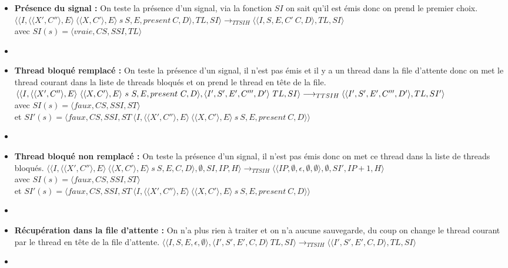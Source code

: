 \documentclass[10pt,a4paper]{report}
\begin{document}
\begin{enumerate}
\begin{itemize}
			\item[] \textbf{Présence du signal :} On teste la présence d'un signal, via la fonction $SI$ on sait qu'il est émis donc on prend le premier choix.
			\smallbreak
			$\langle\langle I,\langle\langle X',C''\rangle,E\rangle~\langle\langle X,C'\rangle,E\rangle~s~S,E,present~C,D\rangle,TL,SI\rangle 
			\longrightarrow_{TTSIH} 
			\langle\langle I,S,E,C'~C,D\rangle,TL,SI\rangle$ 
			\\avec $SI(s) = \langle vraie,CS,SSI,TL\rangle$
			\item[] \newpage
			
			
			
			
			\item[] \textbf{ Thread bloqué remplacé :} On teste la présence d'un signal, il n'est pas émis et il y a un thread dans la file d'attente donc on met le thread courant dans la liste de threads bloqués et on prend le thread en tête de la file.
			\smallbreak
			$\langle\langle I,\langle\langle X',C''\rangle,E\rangle~\langle\langle X,C'\rangle,E\rangle~s~S,E,present~C,D\rangle,\langle I',S',E',C''',D'\rangle~TL,SI\rangle 
			\\\longrightarrow_{TTSIH} 
			\langle\langle I',S',E',C''',D'\rangle,TL,SI'\rangle$ 
			\\avec $SI(s) = \langle faux,CS,SSI,ST\rangle$
			\\et $SI'(s) = \langle faux,CS,SSI,ST~\langle I,\langle\langle X',C''\rangle,E\rangle~\langle\langle X,C'\rangle,E\rangle~s~S,E,present~C,D\rangle\rangle$
			\item[]	
			
			\item[] \textbf{Thread bloqué non remplacé :} On teste la présence d'un signal, il n'est pas émis donc on met ce thread dans la liste de threads bloqués.
			\smallbreak 
			$\langle\langle I,\langle\langle X',C''\rangle,E\rangle~\langle\langle X,C'\rangle,E\rangle~s~S,E,C,D\rangle,\emptyset,SI,IP,H\rangle 
			\longrightarrow_{TTSIH} 
			\langle\langle IP,\emptyset,\epsilon,\emptyset,\emptyset\rangle,\emptyset,SI',IP+1,H\rangle$
			\\avec $SI(s) = \langle faux,CS,SSI,ST\rangle$
			\\et $SI'(s) = \langle faux,CS,SSI,ST~\langle I,\langle\langle X',C''\rangle,E\rangle~\langle\langle X,C'\rangle,E\rangle~s~S,E,present~C,D\rangle\rangle$
			\item[]
			
			\item[] \textbf{Récupération dans la file d'attente :} On n'a plus rien à traiter et on n'a aucune sauvegarde, du coup on change le thread courant par le thread en tête de la file d'attente.
			\smallbreak
			$\langle\langle I,S,E,\epsilon,\emptyset\rangle,\langle I',S',E',C,D\rangle~TL,SI\rangle 
			\longrightarrow_{TTSIH} 
			\langle\langle I',S',E',C,D\rangle,TL,SI\rangle$
			\item[]
			

\end{itemize}
\end{enumerate}
\end{document}
